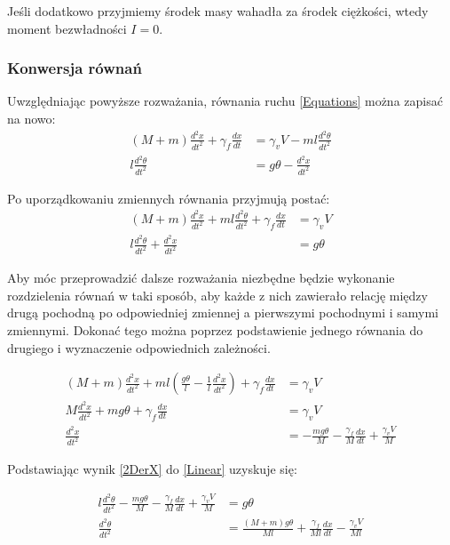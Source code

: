 \documentclass[12pt, oneside]{report}
\theoremstyle{definition}
\begin{document}
Jeśli dodatkowo przyjmiemy środek masy wahadła za środek ciężkości, wtedy moment bezwładności $I = 0$.

\subsubsection{Konwersja równań}
Uwzględniając powyższe rozważania, równania ruchu \ref{Equations} można zapisać na nowo:
\begin{equation}
\begin{aligned}
(M + m) \frac{d^2x}{dt^2} + \gamma_f \frac{dx}{dt} &= \gamma_v V - ml \frac{d^2\theta}{dt^2}\\
l \frac{d^2\theta}{dt^2} &= g\theta - \frac{d^2x}{dt^2}
\end{aligned}
\end{equation}

Po uporządkowaniu zmiennych równania przyjmują postać:
\begin{equation} \label{Linear}
\begin{aligned}
(M + m) \frac{d^2x}{dt^2} + ml \frac{d^2\theta}{dt^2} +  \gamma_f \frac{dx}{dt} &= \gamma_v V\\
l \frac{d^2\theta}{dt^2} + \frac{d^2x}{dt^2} &= g\theta
\end{aligned}
\end{equation}

Aby móc przeprowadzić dalsze rozważania niezbędne będzie wykonanie rozdzielenia równań w taki sposób, aby każde z nich zawierało relację między drugą pochodną po odpowiedniej zmiennej a pierwszymi pochodnymi i samymi zmiennymi. Dokonać tego można poprzez podstawienie jednego równania do drugiego i wyznaczenie odpowiednich zależności.

\begin{equation} \label{2DerX}
\begin{aligned}
(M + m) \frac{d^2x}{dt^2} + ml (\frac{g\theta}{l} - \frac{1}{l} \frac{d^2x}{dt^2}) +  \gamma_f \frac{dx}{dt} &= \gamma_v V\\
M \frac{d^2x}{dt^2} + mg \theta + \gamma_f \frac{dx}{dt} &= \gamma_v V\\
\frac{d^2x}{dt^2} &= -\frac{mg \theta}{M} - \frac{\gamma_f}{M} \frac{dx}{dt} + \frac{\gamma_v V}{M}
\end{aligned}
\end{equation}

Podstawiając wynik \ref{2DerX} do \ref{Linear} uzyskuje się:

\begin{equation}
\begin{aligned}
l \frac{d^2\theta}{dt^2} -\frac{mg \theta}{M} - \frac{\gamma_f}{M} \frac{dx}{dt} + \frac{\gamma_v V}{M} &= g\theta\\
\frac{d^2\theta}{dt^2} &= \frac{(M+m)g\theta}{Ml} + \frac{\gamma_f}{Ml}\frac{dx}{dt} - \frac{\gamma_vV}{Ml}
\end{aligned}
\end{equation}
\end{document}
